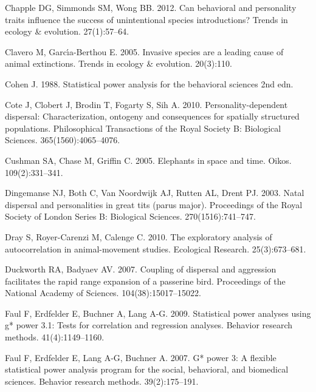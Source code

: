 \documentclass[
]{article}
\begin{document}
\leavevmode\hypertarget{ref-chapple2012can}{}%
Chapple DG, Simmonds SM, Wong BB. 2012. Can behavioral and personality
traits influence the success of unintentional species introductions?
Trends in ecology \& evolution. 27(1):57--64.

\leavevmode\hypertarget{ref-clavero2005invasive}{}%
Clavero M, Garcı́a-Berthou E. 2005. Invasive species are a leading cause
of animal extinctions. Trends in ecology \& evolution. 20(3):110.

\leavevmode\hypertarget{ref-cohen1988statistical}{}%
Cohen J. 1988. Statistical power analysis for the behavioral sciences
2nd edn.

\leavevmode\hypertarget{ref-cote2010personality}{}%
Cote J, Clobert J, Brodin T, Fogarty S, Sih A. 2010.
Personality-dependent dispersal: Characterization, ontogeny and
consequences for spatially structured populations. Philosophical
Transactions of the Royal Society B: Biological Sciences.
365(1560):4065--4076.

\leavevmode\hypertarget{ref-cushman2005elephants}{}%
Cushman SA, Chase M, Griffin C. 2005. Elephants in space and time.
Oikos. 109(2):331--341.

\leavevmode\hypertarget{ref-dingemanse2003natal}{}%
Dingemanse NJ, Both C, Van Noordwijk AJ, Rutten AL, Drent PJ. 2003.
Natal dispersal and personalities in great tits (parus major).
Proceedings of the Royal Society of London Series B: Biological
Sciences. 270(1516):741--747.

\leavevmode\hypertarget{ref-dray2010exploratory}{}%
Dray S, Royer-Carenzi M, Calenge C. 2010. The exploratory analysis of
autocorrelation in animal-movement studies. Ecological Research.
25(3):673--681.

\leavevmode\hypertarget{ref-duckworth2007coupling}{}%
Duckworth RA, Badyaev AV. 2007. Coupling of dispersal and aggression
facilitates the rapid range expansion of a passerine bird. Proceedings
of the National Academy of Sciences. 104(38):15017--15022.

\leavevmode\hypertarget{ref-faul2009statistical}{}%
Faul F, Erdfelder E, Buchner A, Lang A-G. 2009. Statistical power
analyses using g* power 3.1: Tests for correlation and regression
analyses. Behavior research methods. 41(4):1149--1160.

\leavevmode\hypertarget{ref-faul2007g}{}%
Faul F, Erdfelder E, Lang A-G, Buchner A. 2007. G* power 3: A flexible
statistical power analysis program for the social, behavioral, and
biomedical sciences. Behavior research methods. 39(2):175--191.
\end{document}
